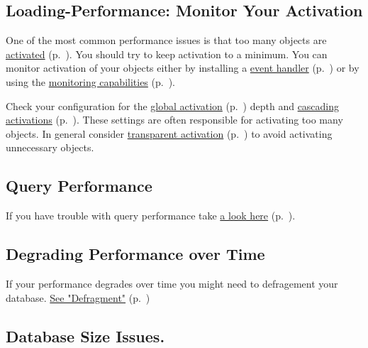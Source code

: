 \subsection{Loading-Performance: Monitor Your Activation}
\label{ref:troubleshoot-speed-issues-html:loadingissues}

One of the most common performance issues is that too many objects are \hyperref[ref:basics-activation]{activated} (p.~\pageref{ref:basics-activation}). You should try to keep activation to a minimum. You can monitor activation of your objects either by installing a \hyperref[ref:advanced-topics-callbacks]{event handler} (p.~\pageref{ref:advanced-topics-callbacks}) or by using the \hyperref[ref:advanced-topics-runtime-statistics]{monitoring capabilities} (p.~\pageref{ref:advanced-topics-runtime-statistics}).

Check your configuration for the \hyperref[ref:configuration-common-activation-depth]{global activation} (p.~\pageref{ref:configuration-common-activation-depth}) depth and \hyperref[ref:configuration-objectclass-cascade-on-activate]{cascading activations} (p.~\pageref{ref:configuration-objectclass-cascade-on-activate}). These settings are often responsible for activating too many objects. In general consider \hyperref[ref:basics-transparent-persistence]{transparent activation} (p.~\pageref{ref:basics-transparent-persistence}) to avoid activating unnecessary objects.

\subsection*{Query Performance}

If you have trouble with query performance take \hyperref[ref:troubleshoot-queries]{a look here} (p.~\pageref{ref:troubleshoot-queries}).

\subsection*{Degrading Performance over Time}

If your performance degrades over time you might need to defragement your database. \hyperref[ref:advanced-topics-defragment]{See "Defragment"} (p.~\pageref{ref:advanced-topics-defragment})

\subsection*{Database Size Issues.}

